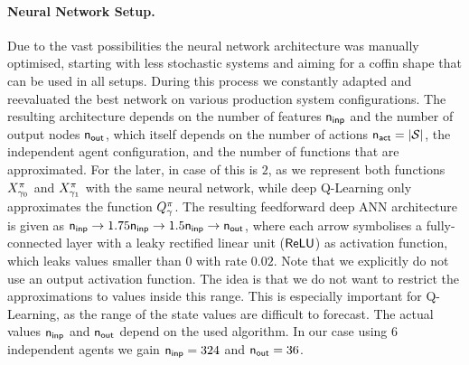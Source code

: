 \documentclass[envcountsame]{llncs}
\begin{document}
\paragraph*{Neural Network Setup.}
%
Due to the vast possibilities the neural network architecture was manually optimised, starting with
less stochastic systems and aiming for a coffin shape that can be used in all setups. During this
process we constantly adapted and reevaluated the best network on various production system
configurations. The resulting architecture depends on the number of features \(\mathsf{n_{inp}}\) and the
number of output nodes \(\mathsf{n_{out}}\), which itself depends on the number of actions
\(\mathsf{n_{act}} = \lvert{\mathcal{S}}\rvert\), the independent agent configuration, and the number of functions that
are approximated. For the later, in case of \ARA{} this is \(2\), as we represent both functions
\(X^\pi_{\gamma_{0}}\) and \(X^\pi_{\gamma_{1}}\) with the same neural network, while deep
Q-Learning \citep[cf.][]{mnih2015human} only approximates the function \(Q_{\gamma}^\pi\).
%
The resulting feedforward deep ANN architecture is given as %
\(\anninp %
\rightarrow 1.75 \anninp %
\rightarrow 1.5 \anninp %
\rightarrow \annout %
\), where each arrow symbolises a fully-connected layer with a leaky rectified linear unit
(\(\mathsf{ReLU}\)) as activation function, which leaks values smaller than \(0\) with rate \(0.02\).
%
Note
that we explicitly do not use an output activation function. The idea is that we do not want to
restrict the approximations to values inside this range. This is especially important for
Q-Learning, as the range of the state values are difficult to forecast.
%
The actual values \(\mathsf{n_{inp}}\) and \(\mathsf{n_{out}}\) depend on the used algorithm. In our case using 6
independent agents we gain \(\mathsf{n_{inp}}=324\) and \(\mathsf{n_{out}}=36\).
%
%
\end{document}
